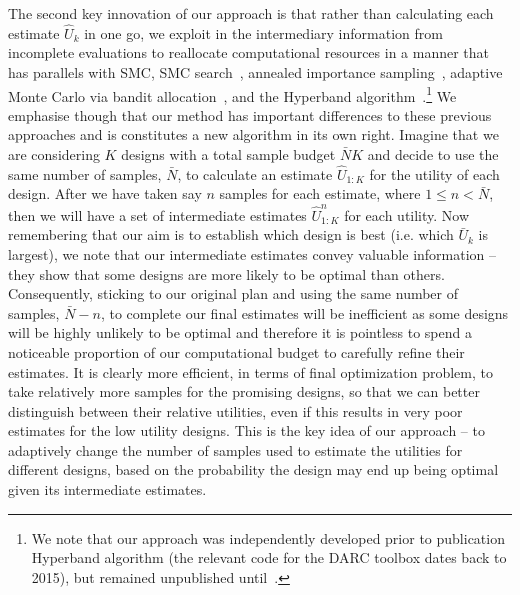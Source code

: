The second key innovation of our approach is that rather than calculating each estimate $\hat{U}_k$ in one go, we
exploit in the intermediary information from incomplete evaluations to reallocate computational
resources in a manner that has parallels with SMC, SMC search~\citep{amzal2006bayesian}, annealed
importance sampling~\citep{neal2001annealed}, adaptive Monte Carlo via bandit 
allocation~\cite{neufeld2014adaptive}, and the Hyperband algorithm~\citep{li2016hyperband}.\footnote{We
	note that our approach was independently developed prior to publication Hyperband algorithm (the relevant
	code for the DARC toolbox dates back to 2015), but remained unpublished until~\cite{vincent2017darc}.}
We emphasise though that our method has important differences
to these previous approaches and is constitutes a new algorithm in its own right.
Imagine that we are considering $K$ designs with a total sample budget $\bar{N}K$
and decide to use the same number of samples, $\bar{N}$, to calculate an estimate $\hat{U}_{1:K}$ for the 
utility of each design.  
After we have taken say $n$ samples
for each estimate, where $1\le n<\bar{N}$, then we will have a set of intermediate estimates $\hat{U}_{1:K}^n$ for
each utility.  Now remembering that our aim is to establish which design is best (i.e. which $\bar{U}_k$ is largest),
we note that our intermediate estimates convey valuable information -- they show that some designs are more
likely to be optimal than others.
Consequently, sticking to our original plan and using the same number of samples, $\bar{N}-n$, 
to complete our final estimates will
be inefficient as some designs will be highly unlikely to be optimal and therefore it is pointless to
spend a noticeable proportion of our computational budget to carefully refine their estimates.  It is clearly 
more efficient, in terms
of final optimization problem, to take relatively more samples for the promising designs, so that we can better 
distinguish between their relative utilities, even if this results in very poor estimates for the low utility
designs.  This is the key idea of our approach -- to adaptively change the number of samples used to estimate
the utilities for different designs, based on the probability the design may end up being optimal given its
intermediate estimates.


